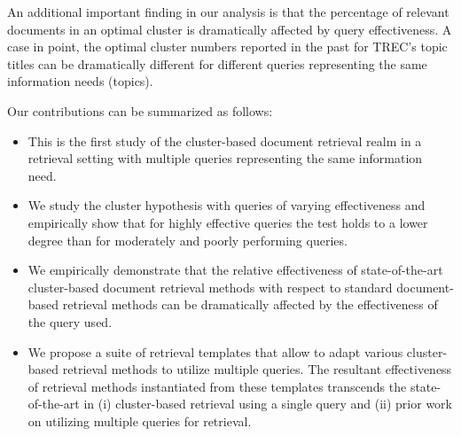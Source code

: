 An additional important finding in our analysis is that the percentage
of relevant documents in an optimal cluster is dramatically affected
by query effectiveness.
A case in point, the optimal cluster numbers reported in the past for
TREC's topic titles \cite{Liu+Croft:06b,Kurland+Domshlak:08a} can be
dramatically different for different queries representing the same
information needs (topics).

Our contributions can be summarized as follows:
\begin{itemize}
\item This is the first study of the cluster-based document retrieval
realm in a retrieval setting with multiple queries representing the
same information need.
\item We study the cluster hypothesis with queries of varying
effectiveness and empirically show that for highly effective queries
the test holds to a lower degree than for moderately and poorly
performing queries.
\item We empirically demonstrate that the relative effectiveness of
state-of-the-art cluster-based document retrieval methods with
respect to standard document-based retrieval methods can be
dramatically affected by the effectiveness of the query used.
\item We propose a suite of retrieval templates that allow to adapt
various cluster-based retrieval methods to utilize multiple queries.
The resultant effectiveness of retrieval methods instantiated from
these templates transcends the state-of-the-art in (i) cluster-based
retrieval using a single query and (ii) prior work on utilizing
multiple queries for retrieval.
\end{itemize}


